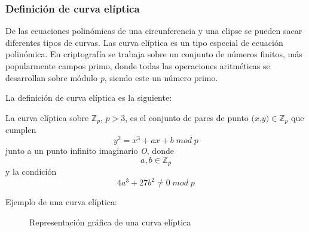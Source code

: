 \subsubsection{Definición de curva elíptica}

De las ecuaciones polinómicas de una circunferencia y una elipse se pueden sacar diferentes tipos de curvas. Las curva elíptica
es un tipo especial de ecuación polinómica. En criptografía se trabaja sobre un conjunto de números finitos, más popularmente
campos primo, donde todas las operaciones aritméticas se desarrollan sobre módulo \textit{p}, siendo este un número primo.

La definición de curva elíptica es la siguiente:

\begin{definition}
    La curva elíptica sobre $\mathbb{Z}_{p}$, $\textit{p} > 3$, es el conjunto de pares de punto $\textit{(x,y)} \in \mathbb{Z}_{p}$ 
    que cumplen 
    \begin{equation}
        y^2 = x^3 + ax + b \; mod \; p
    \end{equation}
    junto a un punto infinito imaginario \textit{O}, donde 
    \begin{equation}
        a, b \in \mathbb{Z}_{p}
    \end{equation} 
    y la condición
    \begin{equation}
        4a^3 + 27b^2 \not = 0 \; mod \; p
    \end{equation}
\end{definition}

Ejemplo de una curva elíptica:

\begin{figure}[H]
    \centering
    \caption{Representación gráfica de una curva elíptica}
\end{figure}

